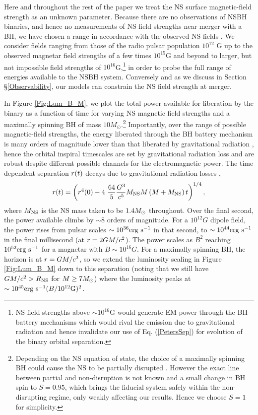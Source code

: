 Here and throughout the rest of the paper we treat the NS surface magnetic-field strength as an unknown parameter. Because there are no observations of NSBH binaries, and hence no measurements of NS field strengths near merger with a BH, we have chosen a range in accordance with the observed NS fields \citep[see \textit{e.g.}][]{Kaspi:2016}. We consider fields ranging from those of the radio pulsar population $10^{12}$ G up to the observed magnetar field strengths of a few times $10^{15}$G \citep{Magnetars:2014} and beyond to larger, but not impossible field strengths of $10^{16}$G,\footnote{NS field strengths above $\sim10^{16}$G would generate EM power through the BH-battery mechanisms which would rival the emission due to gravitational radiation and hence invalidate our use of Eq. (\ref{PetersSep}) for evolution of the  binary orbital separation.} in order to probe the full range of energies available to the NSBH system. 
Conversely and as we discuss in Section \S \ref{Observability}, our models can constrain the NS field strength at merger.


In Figure \ref{Fig:Lum_B_M}, we plot the total power available for
liberation by the binary as a function of time for varying NS magnetic
field strengths and a maximally spinning BH of mass $10M_\odot$.\footnote{Depending on the NS equation of state, the choice of a maximally spinning BH could cause the NS to be partially disrupted \citep[\textit{e.g.}][]{Foucart:2012}. However the exact line between partial and non-disruption is not known and a small change in BH spin to $S=0.95$, which brings the fiducial system safely within the non-disrupting regime, only weakly affecting our results. Hence we choose $S=1$ for simplicity.}
Importantly, over the range of possible magnetic-field strengths, 
the energy liberated through the BH battery mechanism is
many orders of magnitude lower than that liberated by gravitational
radiation \citep{McL:2011}, hence the orbital inspiral timescales are
set by gravitational radiation loss and are robust despite different
possible channels for the electromagnetic power.  The time dependent
separation $r(t)$ decays due to gravitational radiation losses
\cite{Peters64},
\begin{align}
\label{PetersSep}
r(t) = \left( r^4(0) - 4 \ \frac{64}{5} \frac{G^3}{c^5} M_{\rm NS} M \left(M + M_{\rm NS}\right) t \right)^{1/4},
\end{align}
where $M_{\rm NS}$ is the NS mass taken to be $1.4 {M_{\odot}}$ throughout.
Over the final second, the power available climbs by $\sim8$ orders of
magnitude. For a $10^{12}G$ dipole field, the power rises from pulsar
scales $\sim 10^{36} {\rm erg \ s}^{-1}$ in that second, to
$\sim10^{44} {\rm erg \ s}^{-1}$ in the final millisecond (at $r=2
G M/c^2$).  The power scales as $B^2$ reaching $10^{52} {\rm erg
  \ s}^{-1}$ for a magnetar with $B\sim10^{16}G$. For a maximally
spinning BH, the horizon is at $r=G M/c^2$, so we extend the
luminosity scaling in Figure \ref{Fig:Lum_B_M} down to this separation
(noting that we still have $GM/c^2 > R_{\rm{NS}}$ for $M \geq 7
{M_{\odot}}$) where the luminosity peaks at $\sim 10^{45} {\rm erg \ s}^{-1}
(B/10^{12} \rm{G})^2$.
  



